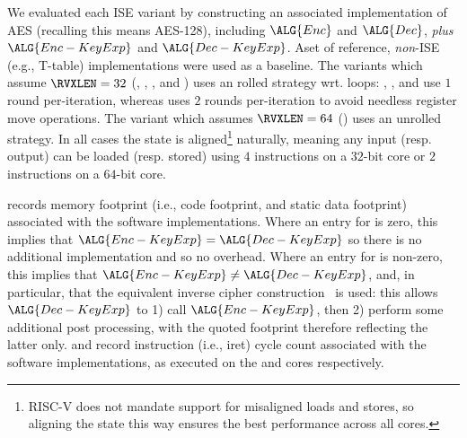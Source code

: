 
We evaluated each ISE variant by constructing an associated implementation
of AES (recalling this means AES-128), including
$\ALG{Enc}$
and
$\ALG{Dec}$,
{\em plus}
$\ALG{Enc-KeyExp}$
and
$\ALG{Dec-KeyExp}$.
Aset of reference, {\em non}-ISE 
(e.g., T-table) 
implementations were used as a baseline.
The variants which assume  $\RVXLEN = 32$
(, ,     , and )
uses an   rolled strategy wrt. loops:
 , ,              and 
use  $1$ round  per-iteration,
whereas
uses $2$ rounds per-iteration
to avoid needless register move operations.
The variant  which assumes $\RVXLEN = 64$
()
uses an unrolled strategy.
In all cases the state is aligned\footnote{%
RISC-V does not mandate support for misaligned loads and stores, so
aligning the state this way ensures the best performance across all
cores.
} naturally, meaning any input (resp. output) can be loaded (resp. stored) 
using 
$4$  instructions on a $32$-bit core
or
$2$  instructions on a $64$-bit core.

records
memory footprint (i.e., code footprint, and static data footprint)
associated with the software implementations.
Where an entry for
is     zero, this implies that
$\ALG{Enc-KeyExp} =    \ALG{Dec-KeyExp}$
so there is no additional implementation and so no overhead.
Where an entry for
is non-zero, this implies that
$\ALG{Enc-KeyExp} \neq \ALG{Dec-KeyExp}$,
and, in particular, that the equivalent inverse cipher construction~\cite[Section 5.3.5]{FIPS:197}
is used: this allows $\ALG{Dec-KeyExp}$ to
1) call $\ALG{Enc-KeyExp}$,
   then
2) perform some additional post processing,
with the quoted footprint therefore reflecting the latter only.  
and
record
instruction (i.e., iret) cycle count
associated with the software implementations,
as executed on the  and  cores respectively.

